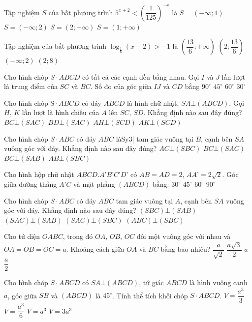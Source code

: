 \begin{ex}
Tập nghiệm $S$ của bất phương trình ${5^{x+2}}<{{\left(\dfrac{1}{125}\right)}^{-x}}$ là
\choice
{$S=\left(-\infty ;1\right)$}
{$S=\left(-\infty ;2\right)$}
{$S=\left(2;+\infty\right)$}
{$S=\left(1;+\infty\right)$}
\end{ex}
\begin{ex}
Tập nghiệm của bất phương trình ${{\log }_{\tfrac{1}{6}}}(x-2)>-1$ là
\choice
{$\left(\dfrac{13}{6};+\infty\right)$}
{$\left(2;\dfrac{13}{6}\right)$}
{$\left(-\infty ;2\right)$}
{$(2;8)$}
\end{ex}
\begin{ex}
Cho hình chóp $S \cdot ABCD$ có tất cả các cạnh đều bằng nhau. Gọi $I$ và $J$ lần lượt là trung điểm của $SC$ và $BC$. Số đo của góc giữa $IJ$ và $CD$ bằng
\choice
{$90^\circ $}
{$45^\circ $}
{$60^\circ $}
{$30^\circ $}
\end{ex}
\begin{ex}
Cho hình chóp $\text{S} \cdot ABCD$ có đáy $ABCD$ là hình chữ nhật, $SA\bot (ABCD)$. Gọi $H$, $K$ lần lượt là hình chiếu của $A$ lên $SC$, $SD$. Khẳng định nào sau đây đúng?
\choice
{$BC\bot (SAC)$}
{$BD\bot (SAC)$}
{$AH\bot (SCD)$}
{$AK\bot (SCD)$}
\end{ex}
\begin{ex}
Cho hình chóp $S \cdot ABC$ có đáy $ABC$ làSy3| tam giác vuông tại $B$, cạnh bên $SA$ vuông góc với đáy. Khẳng định nào sau đây đúng?
\choice
{$AC\bot (SBC)$}
{$BC\bot (SAC)$}
{$BC\bot (SAB)$}
{$AB\bot (SBC)$}
\end{ex}
\begin{ex}
Cho hình hộp chữ nhật $ABCD.A’B’C’D’$ có $AB=AD=2$, $AA’=2\sqrt{2}$. Góc giữa đường thẳng $A’C$ và mặt phẳng $(ABCD)$ bằng:
\choice
{$30^\circ$}
{$45^\circ$}
{$60^\circ$}
{$90^\circ$}
\end{ex}
\begin{ex}
Cho hình chóp $S \cdot ABC$ có đáy $ABC$ tam giác vuông tại $A$, cạnh bên $SA$ vuông góc với đáy. Khẳng định nào sau đây đúng?
\choice
{$(SBC)\bot (SAB)$}
{$(SAC)\bot (SAB)$}
{$(SAC)\bot (SBC)$}
{$(ABC)\bot (SBC)$}
\end{ex}
\begin{ex}
Cho tứ diện $OABC$, trong đó $OA$, $OB$, $OC$ đôi một vuông góc với nhau và $OA=OB=OC=a$. Khoảng cách giữa $OA$ và $BC$ bằng bao nhiêu?
\choice
{$\dfrac{a}{\sqrt{2}}$}
{$\dfrac{a\sqrt{3}}{2}$}
{$a$}
{$\dfrac{a}{2}$}
\end{ex}
\begin{ex}
Cho hình chóp $S \cdot ABCD$ có $SA\bot (ABCD)$, tứ giác $ABCD$ là hình vuông cạnh $a$, góc giữa $SB$ và $(ABCD)$ là $45^\circ $. Tính thể tích khối chóp $S \cdot ABCD$.
\choice
{$V=\dfrac{a^3}{3}$}
{$V=\dfrac{a^3}{6}$}
{$V=a^3$}
{$V=3a^3$}
\end{ex}
